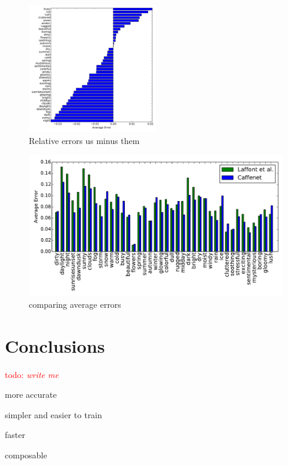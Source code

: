 \documentclass{article}
\newcommand{\todo}[1]{\textcolor{red}{todo: {\em #1}}}
\begin{document}
\begin{figure}[t]
	\centering
		\includegraphics[width=0.5\textwidth]{figs/rel_err.pdf}
		\caption{Relative errors us minus them}\label{fig:relerr}
\end{figure}

\begin{figure}[t]
	\centering
		\includegraphics[width=1.0\textwidth]{figs/avg_err_compare.pdf}
		\caption{comparing average errors}\label{fig:compare}
\end{figure}


\section{Conclusions}

\todo{write me}

more accurate

simpler and easier to train

faster

composable



\end{document}
